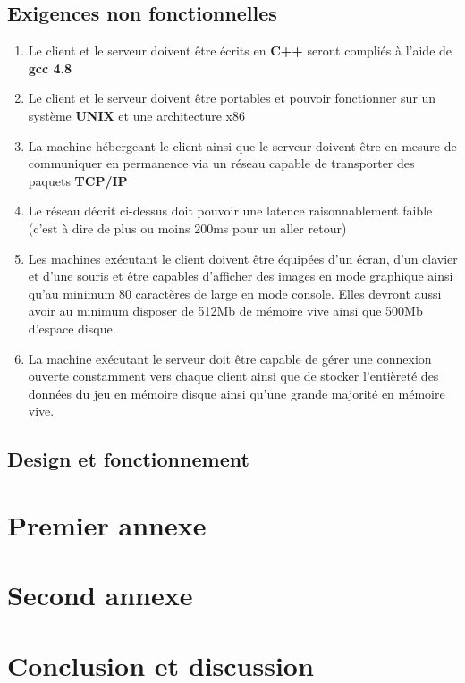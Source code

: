 \documentclass[a4paper]{article}
\begin{document}
\subsection{Exigences non fonctionnelles}
\label{enf}

\begin{enumerate}
\item Le client et le serveur doivent être écrits en \textbf{C++} seront compliés à l'aide de \textbf{gcc 4.8}
\item Le client et le serveur doivent être portables et pouvoir fonctionner sur un système \textbf{UNIX} et une architecture x86
\item La machine hébergeant le client ainsi que le serveur doivent être en mesure de communiquer en permanence via un réseau capable de transporter des paquets \textbf{TCP/IP}
\item Le réseau décrit ci-dessus doit pouvoir une latence raisonnablement faible (c'est à dire de plus ou moins 200ms pour un aller retour)
\item Les machines exécutant le client doivent être équipées d'un écran, d'un clavier et d'une souris et être capables d'afficher des images en mode graphique ainsi qu'au minimum 80 caractères de large en mode console. Elles devront aussi avoir au minimum disposer de 512Mb de mémoire vive ainsi que 500Mb d'espace disque.
\item La machine exécutant le serveur doit être capable de gérer une connexion ouverte constamment vers chaque client ainsi que de stocker l'entièreté des données du jeu en mémoire disque ainsi qu'une grande majorité en mémoire vive.
\end{enumerate}


\subsection{Design et fonctionnement}

\printindex

\appendix

\section{Premier annexe}
\section{Second annexe}

\section{Conclusion et discussion}

\tableofcontents    %
\listoffigures        %
\listoftables        %

\end{document}
